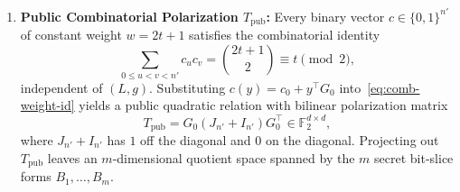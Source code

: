 \documentclass[11pt,a4paper]{article}
\theoremstyle{definition}
\theoremstyle{remark}
\newcommand{\F}{\mathbb{F}}
\begin{document}
\begin{enumerate}[leftmargin=2em]
\[    \]
    \item \textbf{Public Combinatorial Polarization $T_{\text{pub}}$:}
    Every binary vector $c \in \{0, 1\}^{n'}$ of constant weight $w = 2t + 1$ satisfies the combinatorial identity
    \begin{equation}
    \label{eq:comb-weight-id}
        \sum_{0 \le u < v < n'} c_u c_v = \binom{2t+1}{2} \equiv t \pmod 2,
    \end{equation}
    independent of $(L, g)$. Substituting $c(y) = c_0 + y^\top G_0$ into~\eqref{eq:comb-weight-id} yields a public quadratic relation with bilinear polarization matrix
    \begin{equation}
    \label{eq:t-pub-main}
        T_{\text{pub}} = G_0 (J_{n'} + I_{n'}) G_0^\top \in \F_2^{d \times d},
    \end{equation}
    where $J_{n'} + I_{n'}$ has $1$ off the diagonal and $0$ on the diagonal. Projecting out $T_{\text{pub}}$ leaves an $m$-dimensional quotient space spanned by the $m$ secret bit-slice forms $B_1, \dots, B_m$.
\end{enumerate}
\end{document}

